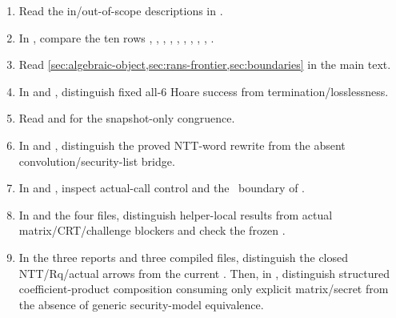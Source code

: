 \begin{enumerate}
  \item Read the in/out-of-scope descriptions in .
  \item In , compare the ten rows
        ,
        ,
        ,
        ,
        ,
        ,
        ,
        ,
        ,
        .
  \item Read \cref{sec:algebraic-object,sec:rans-frontier,sec:boundaries} in the main text.
  \item In  and
        , distinguish fixed all-6
        Hoare success from termination/losslessness.
  \item Read 
        and  for the snapshot-only congruence.
  \item In  and
        , distinguish the proved NTT-word
        rewrite from the absent convolution/security-list bridge.
  \item In  and
        , inspect actual-call control and
        the  \statuspartial\ boundary of
        .
  \item In  and the four
         files, distinguish helper-local results from
        actual matrix/CRT/challenge blockers and check the frozen \FrozenPaperGate.
  \item In the three  reports and three
        compiled  files, distinguish
        the closed NTT/Rq/actual  arrows from the current
        \CurrentGate. Then, in ,
        distinguish structured coefficient-product composition consuming only
        explicit matrix/secret from the absence of generic security-model equivalence.
\end{enumerate}

